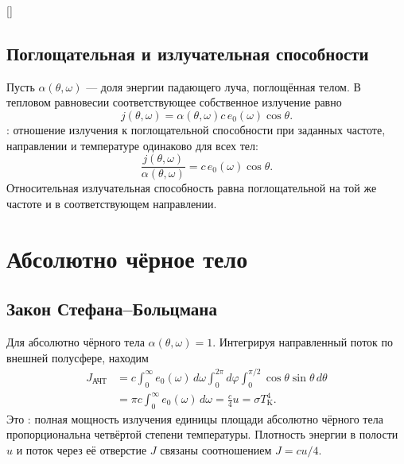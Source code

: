\documentclass[../final.tex]{subfiles}
\begin{document}
\begin{rbox}[unbreakable,left=14pt,right=14pt,top=10pt,bottom=7pt]{[]}
\centering
\captionsetup{font=footnotesize,hypcap=false,skip=5pt}
\end{rbox}

\subsection{Поглощательная и излучательная способности}
Пусть $\alpha(\theta,\omega)$ --- доля энергии падающего луча, поглощённая телом.
В тепловом равновесии соответствующее собственное излучение равно
\begin{equation*}
 j(\theta,\omega)=\alpha(\theta,\omega)c\,e_0(\omega)\cos\theta.
\end{equation*}
: отношение излучения к поглощательной способности
при заданных частоте, направлении и температуре одинаково для всех тел:
\begin{equation*}
 \frac{j(\theta,\omega)}{\alpha(\theta,\omega)}
 =c\,e_0(\omega)\cos\theta.
\end{equation*}
Относительная излучательная способность равна поглощательной
на той же частоте и в соответствующем направлении.

\clearpage
\section{Абсолютно чёрное тело}
\subsection{Закон Стефана--Больцмана}
Для абсолютно чёрного тела $\alpha(\theta,\omega)=1$.
Интегрируя направленный поток по внешней полусфере, находим
\begin{align*}
 J_{\text{АЧТ}}&=c\int_0^\infty e_0(\omega)\,d\omega
 \int_0^{2\pi}d\varphi\int_0^{\pi/2}\cos\theta\sin\theta\,d\theta\\
 &=\pi c\int_0^\infty e_0(\omega)\,d\omega
 =\frac c4u=\sigma T_{\mathrm K}^4.
\end{align*}
Это : полная мощность излучения единицы
площади абсолютно чёрного тела пропорциональна четвёртой степени температуры.
Плотность энергии в полости $u$ и поток через её отверстие $J$ связаны
соотношением $J=cu/4$.
\end{document}
